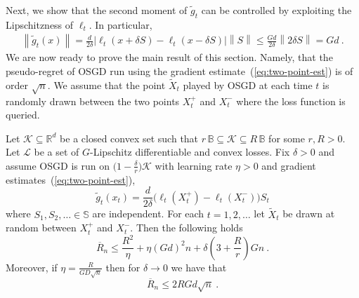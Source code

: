\documentclass[11pt]{hackednow}
\newcommand{\E}{\mathbb{E}}
\newcommand{\R}{\mathbb{R}}
\newcommand{\cL}{\mathcal{L}}
\newcommand{\cK}{\mathcal{K}}
\newcommand{\oR}{\overline{R}}
\newcommand{\Ball}{\mathbb{B}}
\newcommand{\Sphere}{\mathbb{S}}
\newcommand{\norm}[1]{\left\|{#1}\right\|}
\newcommand{\tX}{\widetilde{X}}
\newcommand{\gtilde}{\widetilde{g}}
\begin{document}
%
Next, we show that the second moment of $\gtilde_t$ can be controlled by exploiting the Lipschitzness of $\ell_t$. In particular,
\begin{align*}
    \norm{\gtilde_t(x)}
=
    \frac{d}{2\delta}\bigl|\ell_t(x + \delta S) - \ell_t(x - \delta S)\bigr|\norm{S}
\le
    \frac{Gd}{2\delta}\norm{2\delta S}
=
    Gd~.
\end{align*}
%
We are now ready to prove the main result of this section. Namely, that the pseudo-regret of OSGD run using the gradient estimate~(\ref{eq:two-point-est}) is of order $\sqrt{n}$. We assume that the point $\tX_t$ played by OSGD at each time $t$ is randomly drawn between the two points $X_t^+$ and $X_t^-$ where the loss function is queried.
%
\begin{theorem}
\label{th:two-point}
Let $\cK\subseteq\R^d$ be a closed convex set such that $r\,\Ball\subseteq\cK\subseteq R\,\Ball$ for some $r,R > 0$. 
%
Let $\cL$ be a set of $G$-Lipschitz differentiable and convex losses.
%
Fix $\delta > 0$ and assume OSGD is run on $\bigl(1-\tfrac{\delta}{r}\bigr)\cK$ with learning rate $\eta > 0$ and gradient estimates~(\ref{eq:two-point-est}),
\[
    \gtilde_t(x_t) = \frac{d}{2\delta}\bigl( \ell_t(X_t^+) - \ell_t(X_t^-) \bigr)S_t
\]
where $S_1,S_2,\dots\in\Sphere$ are independent. For each $t=1,2,\dots$ let $\tX_t$ be drawn at random between $X_t^+$ and $X_t^-$. Then
the following holds
\[
\oR_n
\le
    \frac{R^2}{\eta} + \eta (Gd)^2 n + \delta\left(3 + \frac{R}{r} \right) G n~.
\]
Moreover, if $\eta = \tfrac{R}{GD\sqrt{n}}$ then for $\delta\to 0$ we have that
\[
\oR_n
\le
    2RGd\sqrt{n}~.
\]
\end{theorem}
%
\end{document}
